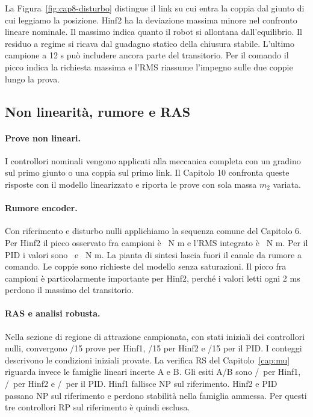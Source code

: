 La Figura~\ref{fig:cap8-disturbo} distingue il link su cui entra la
coppia dal giunto di cui leggiamo la posizione. Hinf2 ha la deviazione
massima minore nel confronto lineare nominale. Il massimo indica
quanto il robot si allontana dall'equilibrio. Il residuo a regime
si ricava dal guadagno statico della chiusura stabile. L'ultimo
campione a 12 s può includere ancora parte del transitorio.
Per il comando il picco indica la richiesta massima e l'RMS
riassume l'impegno sulle due coppie lungo la prova.

\subsection{Non linearità, rumore e RAS}

\paragraph{Prove non lineari.}
I controllori nominali vengono applicati alla meccanica completa
con un gradino sul primo giunto o una coppia sul primo link.
Il Capitolo 10 confronta queste risposte con il modello linearizzato
e riporta le prove con sola massa $m_2$ variata.

\paragraph{Rumore encoder.}
Con riferimento e disturbo nulli applichiamo la sequenza comune
del Capitolo 6. Per Hinf2 il picco osservato fra campioni è
\FinHinfTwoPeak\ N m e l'RMS integrato è \FinHinfTwoRms\ N m.
Per il PID i valori sono \FinPIDPeak\ e \FinPIDRms\ N m. La
pianta di sintesi lascia fuori il canale da rumore a comando.
Le coppie sono richieste del modello senza saturazioni. Il
picco fra campioni è particolarmente importante per Hinf2,
perché i valori letti ogni 2 ms perdono il massimo del transitorio.

\paragraph{RAS e analisi robusta.}
Nella sezione di regione di attrazione campionata, con stati
iniziali dei controllori nulli, convergono \FinHinfOneConv/15
prove per Hinf1, \FinHinfTwoConv/15 per Hinf2 e \FinPIDConv/15
per il PID. I conteggi descrivono le condizioni iniziali provate.
La verifica RS del Capitolo~\ref{cap:mu} riguarda invece le famiglie
lineari incerte A e B. Gli esiti A/B sono
\FinHinfOneRSesitoA/\FinHinfOneRSesitoB\ per Hinf1,
\FinHinfTwoRSesitoA/\FinHinfTwoRSesitoB\ per Hinf2 e
\FinPIDRSesitoA/\FinPIDRSesitoB\ per il PID. Hinf1 fallisce NP
sul riferimento. Hinf2 e PID passano NP sul riferimento e perdono
stabilità nella famiglia ammessa. Per questi tre controllori RP sul
riferimento è quindi esclusa.

